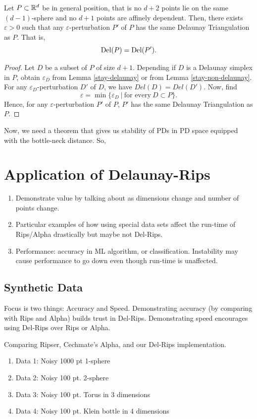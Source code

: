 \documentclass[letterpaper,titlepage]{article}
\begin{document}
    
    \begin{thm}
        Let $P \subset \mathbb{R}^d$ be in general position, that is no $d+2$ points lie on the same $(d-1)$-sphere and no $d+1$ points are affinely dependent. Then, there exists $\varepsilon>0$ such that any $\varepsilon$-perturbation $P'$ of $P$ has the same Delaunay Triangulation as $P$. That is,
        $$\text{Del}(P) = \text{Del}(P').$$
    \end{thm}
    \begin{proof}
        Let $D$ be a subset of $P$ of size $d+1$. Depending if $D$ is a Delaunay simplex in $P$, obtain $\varepsilon_D$ from Lemma \ref{stay-delaunay} or from Lemma \ref{stay-non-delaunay}. For any $\varepsilon_D$-perturbation $D'$ of $D$, we have $Del(D)=Del(D')$. Now, find
        $$\varepsilon = \min \{\varepsilon_D\ |\ \text{for every}\ D \subset P\}.$$
        Hence, for any $\varepsilon$-perturbation $P'$ of $P$, $P'$ has the same Delaunay Triangulation as $P$.
    \end{proof}
    
    Now, we need a theorem that gives us stability of PDs in PD space equipped with the bottle-neck distance. So,



    
\section{Application of Delaunay-Rips}
\begin{enumerate}
    \item Demonstrate value by talking about as dimensions change and number of points change.
    \item Particular examples of how using special data sets affect the run-time of Rips/Alpha drastically but maybe not Del-Rips.
    \item Performance: accuracy in ML algorithm, or classification. Instability may cause performance to go down even though run-time is unaffected.
\end{enumerate}

\subsection{Synthetic Data}
    Focus is two things: Accuracy and Speed. Demonstrating accuracy (by comparing with Rips and Alpha) builds trust in Del-Rips. Demonstrating speed encourages using Del-Rips over Rips or Alpha.

    Comparing Ripser, Cechmate's Alpha, and our Del-Rips implementation.
    \begin{enumerate}
        \item Data 1: Noisy 1000 pt 1-sphere
        \item Data 2: Noisy 100 pt. 2-sphere
        \item Data 3: Noisy 100 pt. Torus in 3 dimensions
        \item Data 4: Noisy 100 pt. Klein bottle in 4 dimensions
    \end{enumerate}
\end{document}
